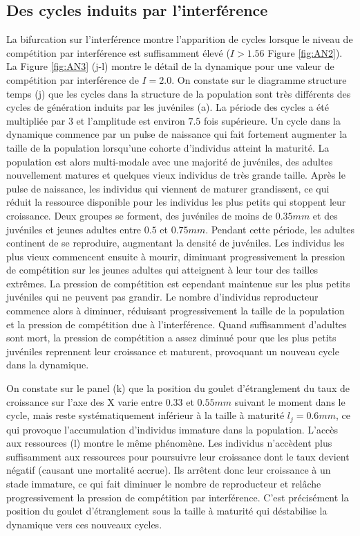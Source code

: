 \subsection{Des cycles induits par l'interférence}

La bifurcation sur l'interférence montre l'apparition de cycles lorsque le
niveau de compétition par interférence est suffisamment élevé ($I>1.56$ Figure
\ref{fig:AN2}). La Figure \ref{fig:AN3} (j-l) montre le détail de la dynamique
pour une valeur de compétition par interférence de $I=2.0$. On constate sur le
diagramme structure temps (j) que les cycles dans la structure de la population
sont très différents des cycles de génération induits par les juvéniles (a). La
période des cycles a été multipliée par $3$ et l'amplitude est environ $7.5$
fois supérieure. Un cycle dans la dynamique commence par un pulse de naissance
qui fait fortement augmenter la taille de la population lorsqu'une cohorte
d'individus atteint la maturité. La population est alors multi-modale avec une majorité
de juvéniles, des adultes nouvellement matures et quelques vieux individus de
très grande taille. Après le pulse de naissance, les individus qui viennent de
maturer grandissent, ce qui réduit la ressource disponible pour les individus
les plus petits qui stoppent leur croissance. Deux groupes se forment, des
juvéniles de moins de $0.35mm$ et des juvéniles et jeunes adultes entre $0.5$ et
$0.75mm$. Pendant cette période, les adultes continent de se reproduire,
augmentant la densité de juvéniles. Les individus les plus vieux commencent
ensuite à mourir, diminuant progressivement la pression de compétition sur les
jeunes adultes qui atteignent à leur tour des tailles extrêmes. La pression de
compétition est cependant maintenue sur les plus petits juvéniles qui ne peuvent
pas grandir. Le nombre d'individus reproducteur commence alors à diminuer,
réduisant progressivement la taille de la population et la pression de
compétition due à l'interférence. Quand suffisamment d'adultes sont mort, la
pression de compétition a assez diminué pour que les plus petits juvéniles
reprennent leur croissance et maturent, provoquant un nouveau cycle dans la
dynamique. 

On constate sur le panel (k) que la position du goulet d'étranglement du taux de
croissance sur l'axe des X varie entre $0.33$ et $0.55mm$ suivant le moment dans
le cycle, mais reste systématiquement inférieur à la taille à maturité
$l_j=0.6mm$, ce qui provoque l'accumulation d'individus immature dans la
population. L'accès aux ressources (l) montre le même phénomène. Les individus
n'accèdent plus suffisamment aux ressources pour poursuivre leur croissance dont
le taux devient négatif (causant une mortalité accrue). Ils arrêtent donc leur
croissance à un stade immature, ce qui fait diminuer le nombre de reproducteur
et relâche progressivement la pression de compétition par interférence. C'est
précisément la position du goulet d'étranglement sous la taille à maturité qui
déstabilise la dynamique vers ces nouveaux cycles. 

